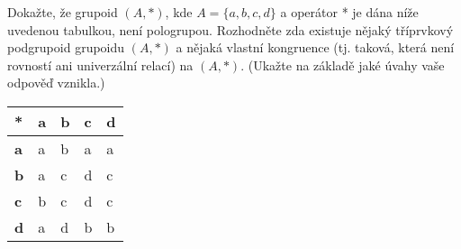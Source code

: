 \subsubsection{}
Dokažte, že grupoid $(A, *)$, kde $A = \{a,b,c,d\}$ a operátor * je dána níže
uvedenou tabulkou, není pologrupou.  Rozhodněte zda existuje nějaký tříprvkový
podgrupoid grupoidu $(A, *)$ a nějaká vlastní kongruence (tj. taková, která není
rovností ani univerzální relací) na $(A, *)$. (Ukažte na základě jaké úvahy vaše
odpověď vznikla.)

\begin{table}[h]
\centering
\begin{tabular}{|l|l|l|l|l|}
\hline
*          & \textbf{a} & \textbf{b} & \textbf{c} & \textbf{d} \\ \hline
\textbf{a} & a          & b          & a          & a          \\ \hline
\textbf{b} & a          & c          & d          & c          \\ \hline
\textbf{c} & b          & c          & d          & c          \\ \hline
\textbf{d} & a          & d          & b          & b          \\ \hline
\end{tabular}
\end{table}
